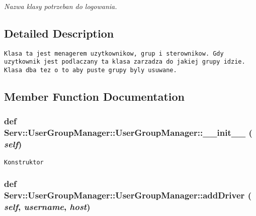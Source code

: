 \begin{CompactItemize}
\begin{CompactList}\small\item\em Nazwa klasy potrzeban do logowania. \item\end{CompactList}\end{CompactItemize}


\subsection{Detailed Description}


\footnotesize\begin{verbatim}Klasa ta jest menagerem uzytkownikow, grup i sterownikow. Gdy uzytkownik jest podlaczany ta klasa zarzadza do jakiej grupy idzie.
Klasa dba tez o to aby puste grupy byly usuwane.    
\end{verbatim}
\normalsize
 

\subsection{Member Function Documentation}
\hypertarget{class_serv_1_1_user_group_manager_1_1_user_group_manager_f43f9798f1e93dd8425699ecd6de6c87}{
\subsubsection[{\_\-\_\-init\_\-\_\-}]{\setlength{\rightskip}{0pt plus 5cm}def Serv::UserGroupManager::UserGroupManager::\_\-\_\-init\_\-\_\- ( {\em self})}}
\label{class_serv_1_1_user_group_manager_1_1_user_group_manager_f43f9798f1e93dd8425699ecd6de6c87}




\footnotesize\begin{verbatim}Konstruktor\end{verbatim}
\normalsize
 \hypertarget{class_serv_1_1_user_group_manager_1_1_user_group_manager_ea0f7f8d1d6e4d5efce31f3d0ea35fd9}{
\subsubsection[{addDriver}]{\setlength{\rightskip}{0pt plus 5cm}def Serv::UserGroupManager::UserGroupManager::addDriver ( {\em self}, \/   {\em username}, \/   {\em host})}}
\label{class_serv_1_1_user_group_manager_1_1_user_group_manager_ea0f7f8d1d6e4d5efce31f3d0ea35fd9}




